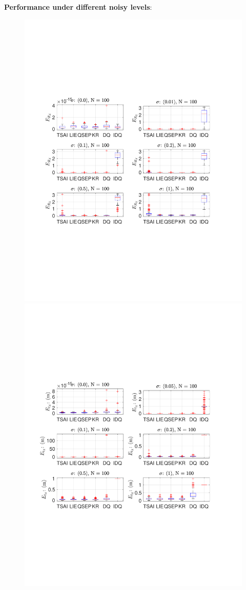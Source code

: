 \documentclass[a4paper]{report}
\begin{document}
\textbf{Performance under different noisy levels}:
\begin{figure}
\centering
\includegraphics[scale=0.6]{./hand_eye_figures/conv/conv_r_err_cmp}
\includegraphics[scale=0.6]{./hand_eye_figures/conv/conv_t_err_cmp}

\end{figure}
\end{document}
